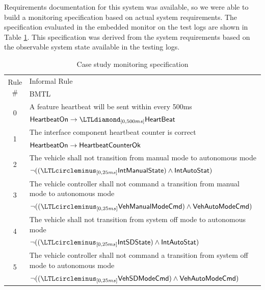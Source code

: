 Requirements documentation for this system was available, so we were able to build a monitoring specification based on actual system requirements.
The specification evaluated in the embedded monitor on the test logs are shown in Table \ref{tab:monspec}. This specification was derived from the system requirements based on the observable system state available in the testing logs. 



\begin{table}[t]
\centering 
\begin{tabular}{|c|p{4.5in}|}
\hline \multirow{2}{*}{Rule \#} & Informal Rule \\ & BMTL \\
\hline \multirow{2}{*}{0} & A feature heartbeat will be sent within every 500ms \\
& $\pred{HeartbeatOn} \rightarrow \LTLdiamond_{[0,500ms]} \pred{HeartBeat}$ \\
\hline \multirow{2}{*}{1} & The interface component heartbeat counter is correct \\
& $\mathsf{HeartbeatOn} \rightarrow \mathsf{HeartbeatCounterOk}$ \\
\hline \multirow{2}{*}{2} & The vehicle shall not transition from manual mode to autonomous mode \\
&  $\neg ((\LTLcircleminus_{[0,25ms]} \pred{IntManualState}) \wedge \pred{IntAutoStat})$\\
\hline \multirow{2}{*}{3} & The vehicle controller shall not command a transition from manual mode to autonomous mode \\
& $\neg ((\LTLcircleminus_{[0,25ms]} \pred{VehManualModeCmd}) \wedge \pred{VehAutoModeCmd})$\\
\hline \multirow{2}{*}{4} & The vehicle shall not transition from system off mode to autonomous mode \\ 
&  $\neg ((\LTLcircleminus_{[0,25ms]} \pred{IntSDState}) \wedge \pred{IntAutoStat})$\\
\hline \multirow{2}{*}{5} & The vehicle controller shall not command a transition from system off mode to autonomous mode \\
& $\neg ((\LTLcircleminus_{[0,25ms]} \pred{VehSDModeCmd}) \wedge \pred{VehAutoModeCmd})$\\
\hline
\end{tabular}
\caption{Case study monitoring specification \label{tab:monspec}}
\end{table}

